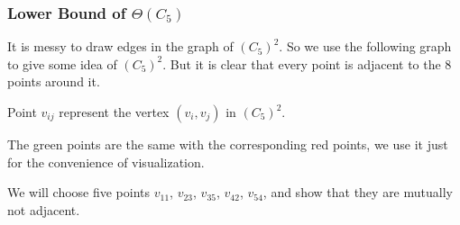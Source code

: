 \begin{frame}
      \frametitle{Lower Bound of $\Theta(C_{5})$}

      It is messy to draw edges in the graph of $(C_{5})^{2}$. So we use the following graph to give some idea of $(C_{5})^{2}$. But it is clear that every point is adjacent to the 8 points around it.

      Point $v_{ij}$ represent the vertex $(v_{i},v_{j})$ in $(C_{5})^{2}$.

      The green points are the same with the corresponding red points, we use it just for the convenience of visualization.

      We will choose five points $v_{11}$, $v_{23}$, $v_{35}$, $v_{42}$, $v_{54}$, and show that they are mutually not adjacent.

\end{frame}

